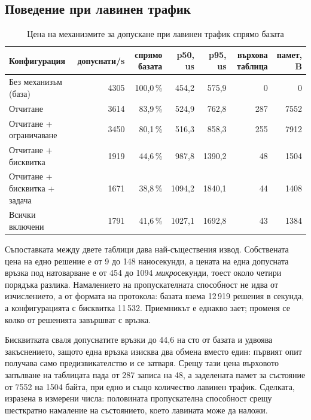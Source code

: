 \subsection{Поведение при лавинен трафик}
\label{subsec:res_admission}

\begin{table}[htbp]
\caption{Цена на механизмите за допускане при лавинен трафик спрямо базата}
\label{tab:admission}
\centering
\fontsize{10}{12}\selectfont
\begin{adjustbox}{max width=\textwidth}
\begin{tabular}{L{3.9cm} r r r r r r}
\toprule
Конфигурация & допуснати/s & спрямо базата & p50, us & p95, us & върхова таблица & памет, B \\
\midrule
Без механизъм (база) & 4305 & 100,0\,\% & 454,2 & 575,9 & 0 & 0 \\
Отчитане & 3614 & 83,9\,\% & 524,9 & 762,8 & 287 & 7552 \\
Отчитане + ограничаване & 3450 & 80,1\,\% & 516,3 & 858,3 & 255 & 7912 \\
Отчитане + бисквитка & 1919 & 44,6\,\% & 987,8 & 1390,2 & 48 & 1504 \\
Отчитане + бисквитка + задача & 1671 & 38,8\,\% & 1094,2 & 1840,1 & 44 & 1408 \\
Всички включени & 1791 & 41,6\,\% & 1027,1 & 1692,8 & 43 & 1384 \\
\bottomrule
\end{tabular}
\end{adjustbox}
\end{table}

Съпоставката между двете таблици дава най-съществения извод. Собствената цена на едно решение е
от 9 до 148 наносекунди, а цената на една допусната връзка под натоварване е от 454 до 1094
\emph{микро}секунди, тоест около четири порядъка разлика. Намалението на пропускателната
способност не идва от изчислението, а от формата на протокола: базата взема 12\,919 решения в
секунда, а конфигурацията с бисквитка 11\,532. Приемникът е еднакво зает; променя се колко от
решенията завършват с връзка.

Бисквитката сваля допуснатите връзки до 44,6 на сто от базата и удвоява закъснението, защото една
връзка изисква два обмена вместо един: първият опит получава само предизвикателство и се затваря.
Срещу тази цена върховото запълване на таблицата пада от 287 записа на 48, а заделената памет за
състояние от 7552 на 1504 байта, при едно и също количество лавинен трафик. Сделката, изразена в
измерени числа: половината пропускателна способност срещу шесткратно намаление на състоянието,
което лавината може да наложи.

